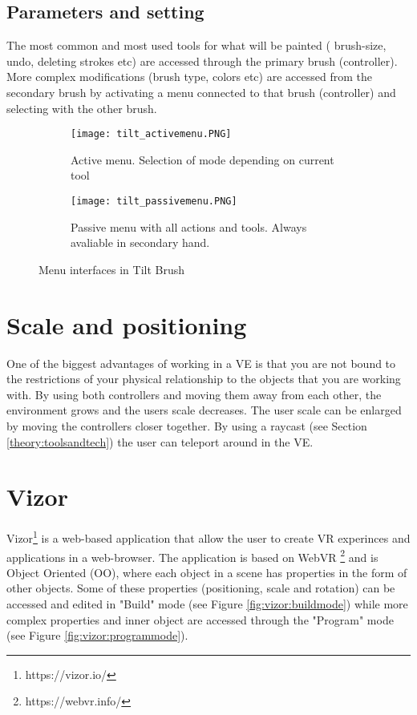 \subsection{Parameters and setting}
The most common and most used tools for what will be painted ( brush-size, undo, deleting strokes etc) are accessed through the primary brush (controller). More complex modifications (brush type, colors etc) are accessed from the secondary brush by activating a menu connected to that brush (controller) and selecting with the other brush.
\begin{figure}
\begin{subfigure}{.5\textwidth}
  \centering
  \texttt{[image: tilt\_activemenu.PNG]}
  \caption{Active menu. Selection of mode depending on current tool}
  \label{fig:tilt:activemenu}
\end{subfigure}%
\begin{subfigure}{.5\textwidth}
  \centering
  \texttt{[image: tilt\_passivemenu.PNG]}
  \caption{Passive menu with all actions and tools. Always avaliable in secondary hand. }
  \label{fig:tilt:passivemenu}
\end{subfigure}
\caption{Menu interfaces in Tilt Brush}
\label{fig:tilt}
\end{figure}
\section{Scale and positioning}
One of the biggest advantages of working in a VE is that you are not bound to the restrictions of your physical relationship to the objects that you are working with. By using both controllers and moving them away from each other, the environment grows and the users scale decreases. The user scale can be enlarged by moving the controllers closer together.
By using a raycast (see Section \ref{theory:toolsandtech}) the user can teleport around in the VE.

\section{Vizor}
Vizor\footnote{https://vizor.io/} is a web-based application that allow the user to create VR experinces and applications in a web-browser. The application is based on WebVR \footnote{https://webvr.info/} and is Object Oriented (OO), where each object in a scene has properties in the form of other objects. Some of these properties (positioning, scale and rotation) can be accessed and edited in "Build" mode (see Figure \ref{fig:vizor:buildmode}) while more complex properties and inner object are accessed through the "Program" mode (see Figure \ref{fig:vizor:programmode}).

